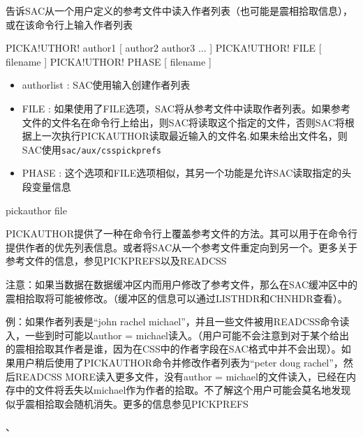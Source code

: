 \label{cmd:pickauthor}

告诉SAC从一个用户定义的参考文件中读入作者列表（也可能是震相拾取信息），或在该命令行上输入作者列表

\begin{SACSTX}
PICKA!UTHOR! author1 [ author2 author3 ... ]
PICKA!UTHOR! FILE [ filename ]
PICKA!UTHOR! PHASE [ filename ]
\end{SACSTX}

\begin{itemize}
\item authorlist : SAC使用输入创建作者列表 
\item FILE : 如果使用了FILE选项，SAC将从参考文件中读取作者列表。如果参考文件的文件名在命令行上给出，则SAC将读取这个指定的文件，否则SAC将根据上一次执行PICKAUTHOR读取最近输入的文件名.如果未给出文件名，则SAC使用\texttt{sac/aux/csspickprefs}
\item PHASE : 这个选项和FILE选项相似，其另一个功能是允许SAC读取指定的头段变量信息 
\end{itemize}

\begin{SACDFT}
pickauthor file
\end{SACDFT}

PICKAUTHOR提供了一种在命令行上覆盖参考文件的方法。其可以用于在命令行提供作者的优先列表信息。或者将SAC从一个参考文件重定向到另一个。更多关于参考文件的信息，参见PICKPREFS以及READCSS

注意：如果当数据在数据缓冲区内而用户修改了参考文件，那么在SAC缓冲区中的震相拾取将可能被修改。（缓冲区的信息可以通过LISTHDR和CHNHDR查看）。

例：如果作者列表是``john rachel michael''，并且一些文件被用READCSS命令读入，一些到时可能以author = michael读入。（用户可能不会注意到对于某个给出的震相拾取其作者是谁，因为在CSS中的作者字段在SAC格式中并不会出现）。如果用户稍后使用了PICKAUTHOR命令并修改作者列表为``peter doug rachel''，然后READCSS MORE读入更多文件，没有author = michael的文件读入，已经在内存中的文件将丢失以michael作为作者的拾取。不了解这个用户可能会莫名地发现似乎震相拾取会随机消失。更多的信息参见PICKPREFS

、
